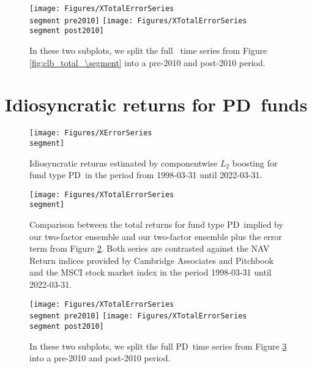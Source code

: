 \begin{figure}[H]
	\centering
	\texttt{[image: Figures/XTotalErrorSeries\\segment pre2010]}
	\texttt{[image: Figures/XTotalErrorSeries\\segment post2010]}
	\caption{
		In these two subplots, we split the full \segment \ time series from Figure \ref{fig:clb_total_\segment} into a pre-2010 and post-2010 period.
	}
	\label{fig:clb_pre_post_2010_\segment}
\end{figure}


\renewcommand{\segment}{PD}

\section{Idiosyncratic returns for \segment \ funds}
\label{sec:errors_pd}

\begin{figure}[H]
	\centering
	\texttt{[image: Figures/XErrorSeries\\segment]}
	\caption{Idiosyncratic returns estimated by componentwise $L_2$ boosting for fund type \segment \ in the period from 1998-03-31 until 2022-03-31.}
	\label{fig:clb_idio_\segment}
\end{figure}

\begin{figure}[H]
	\centering
	\texttt{[image: Figures/XTotalErrorSeries\\segment]}
	\caption{
		Comparison between the total returns for fund type \segment \ implied by our two-factor ensemble and our two-factor ensemble plus the error term from Figure \ref{fig:clb_idio_\segment}.
		Both series are contrasted against the NAV Return indices provided by Cambridge Associates and Pitchbook and the MSCI stock market index in the period 1998-03-31 until 2022-03-31.
	}
	\label{fig:clb_total_\segment}
\end{figure}

\begin{figure}[H]
	\centering
	\texttt{[image: Figures/XTotalErrorSeries\\segment pre2010]}
	\texttt{[image: Figures/XTotalErrorSeries\\segment post2010]}
	\caption{
		In these two subplots, we split the full \segment \ time series from Figure \ref{fig:clb_total_\segment} into a pre-2010 and post-2010 period.
	}
	\label{fig:clb_pre_post_2010_\segment}
\end{figure}

